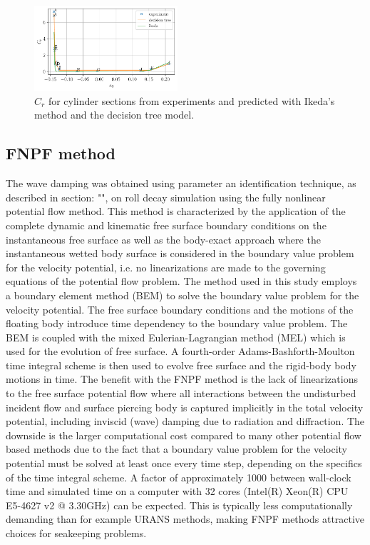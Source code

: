 \begin{figure}[H]
\begin{center}\includegraphics[width = 0.475\textwidth]{figures/ikeda_sections.pdf}\end{center}
\vspace{-0.7cm}
\caption{$C_r$ for cylinder sections from experiments and predicted with Ikeda's method and the decision tree model.}
\label{fig:ikeda_sections}
\end{figure}
\subsection*{FNPF method}\label{fnpf-method}
\label{fnpf-method} The wave damping was obtained using parameter an
identification technique, as described in section: "",
on roll decay simulation using the fully nonlinear potential flow
method. This method is characterized by the application of the complete
dynamic and kinematic free surface boundary conditions on the
instantaneous free surface as well as the body-exact approach where the
instantaneous wetted body surface is considered in the boundary value
problem for the velocity potential, i.e. no linearizations are made to
the governing equations of the potential flow problem.
\quad The method used in this study employs a boundary element method
(BEM) \citep{7505983/FD4N3DW2} to solve the boundary value problem for
the velocity potential.
\quad The free surface boundary conditions and the motions of the
floating body introduce time dependency to the boundary value problem.
The BEM is coupled with the mixed Eulerian-Lagrangian method (MEL)
\citep{7505983/ZKB494GT} which is used for the evolution of free surface.
A fourth-order Adams-Bashforth-Moulton time integral scheme is then used
to evolve free surface and the rigid-body body motions in time.
\quad The benefit with the FNPF method is the lack of linearizations to
the free surface potential flow where all interactions between the
undisturbed incident flow and surface piercing body is captured
implicitly in the total velocity potential, including inviscid (wave)
damping due to radiation and diffraction. The downside is the larger
computational cost compared to many other potential flow based methods
due to the fact that a boundary value problem for the velocity potential
must be solved at least once every time step, depending on the specifics
of the time integral scheme. A factor of approximately 1000 between
wall-clock time and simulated time on a computer with 32 cores (Intel(R)
Xeon(R) CPU E5-4627 v2 @ 3.30GHz) can be expected. This is typically
less computationally demanding than for example URANS methods, making
FNPF methods attractive choices for seakeeping problems.
